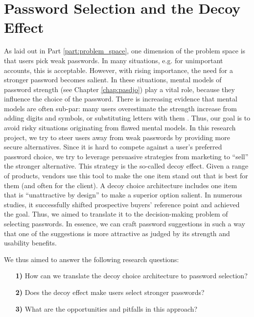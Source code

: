 \chapter[Password Selection and the Decoy Effect]{Password Selection and the Decoy Effect}\label{chap:decoy}
As laid out in Part \ref{part:problem_space}, one dimension of the problem space is that users pick weak passwords. In many situations, e.g. for unimportant accounts, this is acceptable. However, with rising importance, the need for a stronger password becomes salient. In these situations, mental models of password strength (see Chapter \ref{chap:pasdjo}) play a vital role, because they influence the choice of the password. There is increasing evidence that mental models are often sub-par: many users overestimate the strength increase from adding digits and symbols, or substituting letters with them \cite{Seitz2017PASDJO, Ur2015PWCreationLab, Ur2016PerceptionsPassword}. Thus, our goal is to avoid risky situations originating from flawed mental models. In this research project, we try to steer users away from weak passwords by providing more secure alternatives. Since it is hard to compete against a user's preferred password choice, we try to leverage persuasive strategies from marketing to ``sell'' the stronger alternative. This strategy is the so-called decoy effect. Given a range of products, vendors use this tool to make the one item stand out that is best for them (and often for the client). A decoy choice architecture includes one item that is ``unattractive by design'' to make a superior option salient. In numerous studies, it successfully shifted prospective buyers' reference point and achieved the goal. Thus, we aimed to translate it to the decision-making problem of selecting passwords. In essence, we can craft password suggestions in such a way that one of the suggestions is more attractive as judged by its strength and usability benefits. 

We thus aimed to answer the following research questions:

\begin{itemize}
	\item[\textbf{1)}] How can we translate the decoy choice architecture to password selection?	
	\item[\textbf{2)}] Does the decoy effect make users select stronger passwords?
	\item[\textbf{3)}] What are the opportunities and pitfalls in this approach?
\end{itemize}
	
